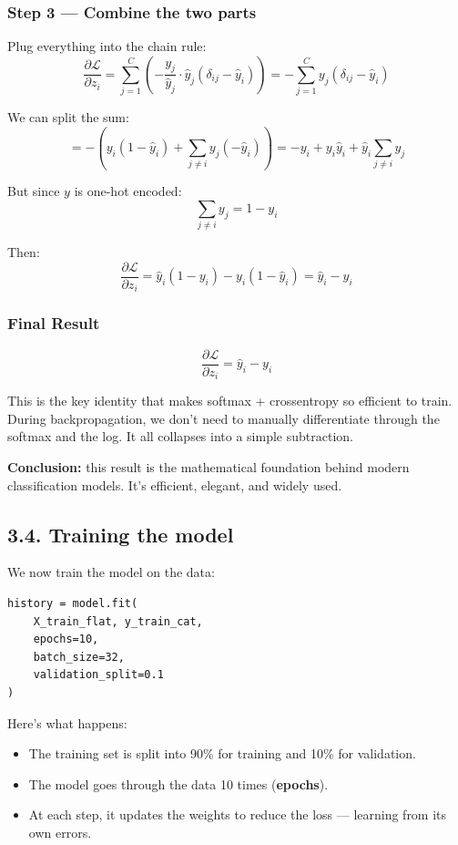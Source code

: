 \documentclass[11pt]{article}
\begin{document}
\subsubsection*{Step 3 — Combine the two parts}

Plug everything into the chain rule:
\[
\frac{\partial \mathcal{L}}{\partial z_i}
= \sum_{j=1}^C \left( -\frac{y_j}{\hat{y}_j} \cdot \hat{y}_j (\delta_{ij} - \hat{y}_i) \right)
= -\sum_{j=1}^C y_j (\delta_{ij} - \hat{y}_i)
\]

We can split the sum:
\[
= -\left( y_i (1 - \hat{y}_i) + \sum_{j \ne i} y_j (-\hat{y}_i) \right)
= -y_i + y_i \hat{y}_i + \hat{y}_i \sum_{j \ne i} y_j
\]

But since $y$ is one-hot encoded:
\[
\sum_{j \ne i} y_j = 1 - y_i
\]

Then:
\[
\frac{\partial \mathcal{L}}{\partial z_i} = \hat{y}_i (1 - y_i) - y_i (1 - \hat{y}_i) = \hat{y}_i - y_i
\]

\subsubsection*{Final Result}

\[
\boxed{
\frac{\partial \mathcal{L}}{\partial z_i} = \hat{y}_i - y_i
}
\]

This is the key identity that makes softmax + crossentropy so efficient to train.  
During backpropagation, we don’t need to manually differentiate through the softmax and the log. It all collapses into a simple subtraction.

\medskip
\noindent
\textbf{Conclusion:} this result is the mathematical foundation behind modern classification models. It’s efficient, elegant, and widely used.

\subsection*{3.4. Training the model}

We now train the model on the data:

\begin{verbatim}
history = model.fit(
    X_train_flat, y_train_cat,
    epochs=10,
    batch_size=32,
    validation_split=0.1
)
\end{verbatim}

Here’s what happens:
\begin{itemize}
    \item The training set is split into 90\% for training and 10\% for validation.
    \item The model goes through the data 10 times (\textbf{epochs}).
    \item At each step, it updates the weights to reduce the loss — learning from its own errors.
\end{itemize}
\end{document}
